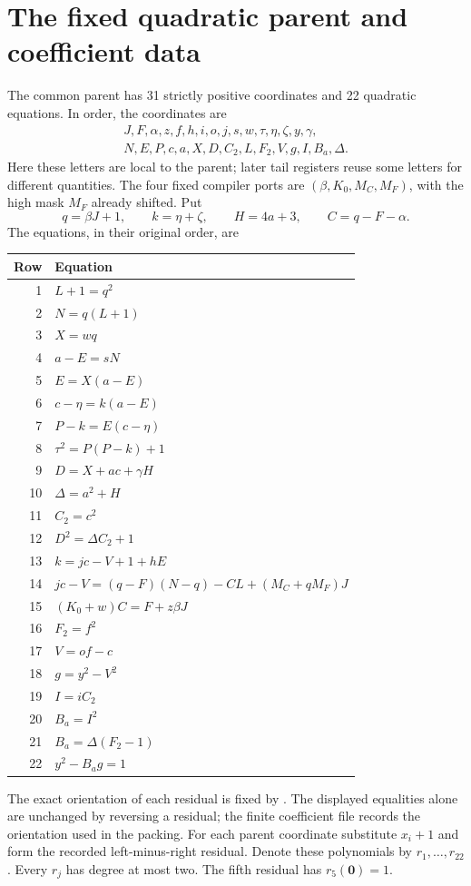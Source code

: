 \documentclass[11pt]{article}
\newcommand{\file}[1]{\texttt{\small\detokenize{#1}}}
\theoremstyle{definition}\newtheorem{definition}[theorem]{Definition}
\theoremstyle{remark}\newtheorem{remark}[theorem]{Remark}
\begin{document}
\section{The fixed quadratic parent and coefficient data}
\label{sec:parent}
The common parent has 31 strictly positive coordinates and 22 quadratic
equations. In order, the coordinates are
\[
\begin{gathered}
J,F,\alpha,z,f,h,i,o,j,s,w,\tau,\eta,\zeta,y,\gamma,\\
N,E,P,c,a,X,D,C_2,L,F_2,V,g,I,B_a,\Delta.
\end{gathered}
\]
Here these letters are local to the parent; later tail registers reuse some
letters for different quantities. The four fixed compiler ports are
$(\beta,K_0,M_C,M_F)$, with the high mask $M_F$ already shifted. Put
\[
q=\beta J+1,\qquad k=\eta+\zeta,\qquad
H=4a+3,\qquad C=q-F-\alpha.
\]
The equations, in their original order, are
\begin{longtable}{@{}r@{\quad}l@{}}
\toprule Row & Equation\\\midrule\endhead
1& $L+1=q^2$\\
2& $N=q(L+1)$\\
3& $X=wq$\\
4& $a-E=sN$\\
5& $E=X(a-E)$\\
6& $c-\eta=k(a-E)$\\
7& $P-k=E(c-\eta)$\\
8& $\tau^2=P(P-k)+1$\\
9& $D=X+ac+\gamma H$\\
10& $\Delta=a^2+H$\\
11& $C_2=c^2$\\
12& $D^2=\Delta C_2+1$\\
13& $k=jc-V+1+hE$\\
14& $jc-V=(q-F)(N-q)-CL+(M_C+qM_F)J$\\
15& $(K_0+w)C=F+z\beta J$\\
16& $F_2=f^2$\\
17& $V=of-c$\\
18& $g=y^2-V^2$\\
19& $I=iC_2$\\
20& $B_a=I^2$\\
21& $B_a=\Delta(F_2-1)$\\
22& $y^2-B_ag=1$\\\bottomrule
\end{longtable}

The exact orientation of each residual is fixed by
\file{data/parent_system.json}. The displayed equalities alone are
unchanged by reversing a residual; the finite coefficient file records
the orientation used in the packing. For each parent coordinate substitute
$x_i+1$ and form the recorded left-minus-right residual. Denote these
polynomials by $r_1,\ldots,r_{22}$. Every $r_j$ has degree at most two.
The fifth residual has $r_5(\mathbf0)=1$.
\end{document}
